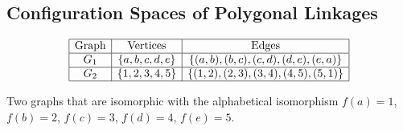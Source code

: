 \subsection{Configuration Spaces of Polygonal Linkages}

\begin{table}[!ht]
\begin{center}
$$\begin{array}{|c|c|c|}\hline
\text{Graph}&\text{Vertices}&\text{Edges}\\\hline
G_1&\left\lbrace a,b,c,d,e \right\rbrace & \left\lbrace (a,b),(b,c),(c,d),(d,e),(e,a) \right\rbrace 
\\\hline
G_2&\left\lbrace 1,2,3,4,5 \right\rbrace & \left\lbrace (1,2),(2,3),(3,4),(4,5),(5,1) \right\rbrace 
\\\hline
\end{array} $$
\caption{Two graphs that are isomorphic with the alphabetical isomorphism $f(a)=1$, $f(b)=2$, $f(c) 
= 3$, $f(d)=4$, $f(e)=5$.}
\end{center} 
\label{table:configuration-1}
\end{table} 
